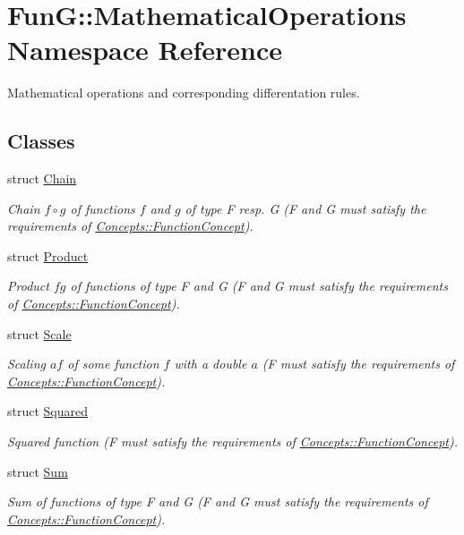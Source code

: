 \hypertarget{namespaceFunG_1_1MathematicalOperations}{}\section{Fun\+G\+:\+:Mathematical\+Operations Namespace Reference}
\label{namespaceFunG_1_1MathematicalOperations}


Mathematical operations and corresponding differentation rules.  


\subsection*{Classes}
\begin{DoxyCompactItemize}
\item 
struct \hyperlink{structFunG_1_1MathematicalOperations_1_1Chain}{Chain}
\begin{DoxyCompactList}\small\item\em Chain $ f\circ g $ of functions $f$ and $g$ of type F resp. G (F and G must satisfy the requirements of \hyperlink{structFunG_1_1Concepts_1_1FunctionConcept}{Concepts\+::\+Function\+Concept}). \end{DoxyCompactList}\item 
struct \hyperlink{structFunG_1_1MathematicalOperations_1_1Product}{Product}
\begin{DoxyCompactList}\small\item\em Product $fg$ of functions of type F and G (F and G must satisfy the requirements of \hyperlink{structFunG_1_1Concepts_1_1FunctionConcept}{Concepts\+::\+Function\+Concept}). \end{DoxyCompactList}\item 
struct \hyperlink{structFunG_1_1MathematicalOperations_1_1Scale}{Scale}
\begin{DoxyCompactList}\small\item\em Scaling $ af $ of some function $ f $ with a double $ a $ (F must satisfy the requirements of \hyperlink{structFunG_1_1Concepts_1_1FunctionConcept}{Concepts\+::\+Function\+Concept}). \end{DoxyCompactList}\item 
struct \hyperlink{structFunG_1_1MathematicalOperations_1_1Squared}{Squared}
\begin{DoxyCompactList}\small\item\em Squared function (F must satisfy the requirements of \hyperlink{structFunG_1_1Concepts_1_1FunctionConcept}{Concepts\+::\+Function\+Concept}). \end{DoxyCompactList}\item 
struct \hyperlink{structFunG_1_1MathematicalOperations_1_1Sum}{Sum}
\begin{DoxyCompactList}\small\item\em Sum of functions of type F and G (F and G must satisfy the requirements of \hyperlink{structFunG_1_1Concepts_1_1FunctionConcept}{Concepts\+::\+Function\+Concept}). \end{DoxyCompactList}\end{DoxyCompactItemize}


